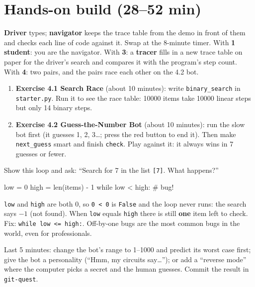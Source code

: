 \section{Hands-on build (28--52 min)}
\begin{pairroles}
\textbf{Driver} types; \textbf{navigator} keeps the trace table from the demo in front of them and checks each line of code against it. Swap at the 8-minute timer.
With \textbf{1 student}: you are the navigator. With \textbf{3}: a \textbf{tracer} fills in a new trace table on paper for the driver's search and compares it with the program's step count. With \textbf{4}: two pairs, and the pairs race each other on the 4.2 bot.
\end{pairroles}
\begin{enumerate}[itemsep=2pt]
  \item \textbf{Exercise 4.1 Search Race} (about 10 minutes): write \texttt{binary\_search} in \texttt{starter.py}. Run it to see the race table: 10000 items take 10000 linear steps but only 14 binary steps.
  \item \textbf{Exercise 4.2 Guess-the-Number Bot} (about 10 minutes): run the slow bot first (it guesses 1, 2, 3\ldots; press the red  button to end it). Then make \texttt{next\_guess} smart and finish \texttt{check}. Play against it: it always wins in 7 guesses or fewer.
\end{enumerate}

\begin{bughunt}
Show this loop and ask: \enquote{Search for 7 in the list \texttt{[7]}. What happens?}
\begin{pycode}
    low = 0
    high = len(items) - 1
    while low < high:          # bug!
\end{pycode}
\texttt{low} and \texttt{high} are both 0, so \texttt{0 < 0} is \texttt{False} and the loop never runs: the search says $-1$ (not found). When \texttt{low} equals \texttt{high} there is still \textbf{one} item left to check. Fix: \texttt{while low <= high:}. Off-by-one bugs are the most common bugs in the world, even for professionals.
\end{bughunt}

\begin{freebuild}
Last 5 minutes: change the bot's range to 1--1000 and predict its worst case first; give the bot a personality (\enquote{Hmm, my circuits say\ldots}); or add a \enquote{reverse mode} where the computer picks a secret and the human guesses. Commit the result in \texttt{git-quest}.
\end{freebuild}

